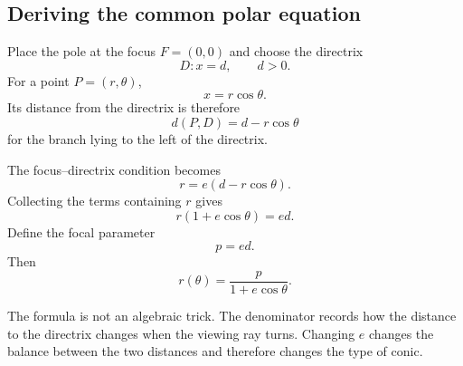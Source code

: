 \subsection{Deriving the common polar equation}

Place the pole at the focus $F=(0,0)$ and choose the directrix
\[
D:x=d,
\qquad d>0.
\]
For a point $P=(r,\theta)$,
\[
x=r\cos\theta.
\]
Its distance from the directrix is therefore
\[
d(P,D)=d-r\cos\theta
\]
for the branch lying to the left of the directrix.

The focus--directrix condition becomes
\[
r=e(d-r\cos\theta).
\]
Collecting the terms containing $r$ gives
\[
r(1+e\cos\theta)=ed.
\]
Define the focal parameter
\[
\boxed{p=ed}.
\]
Then
\[
\boxed{r(\theta)=\frac{p}{1+e\cos\theta}}.
\]

\begin{center}
\end{center}

\begin{corebox}
The formula is not an algebraic trick. The denominator records how the distance
to the directrix changes when the viewing ray turns. Changing $e$ changes the
balance between the two distances and therefore changes the type of conic.
\end{corebox}
